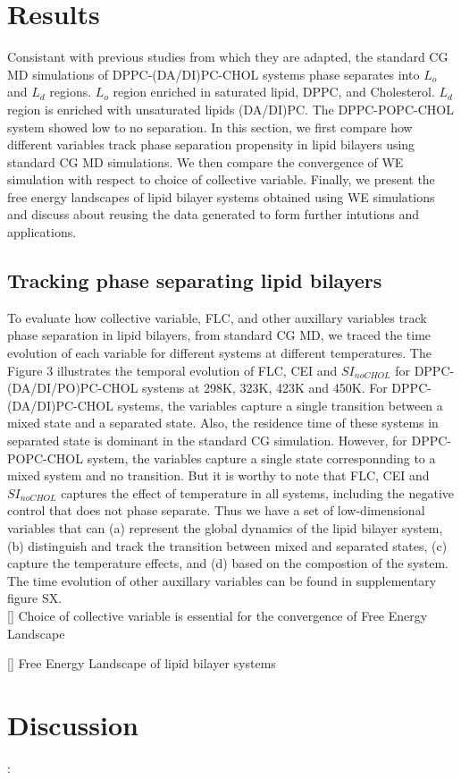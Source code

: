 \documentclass{biophys-new}
\begin{document}
\section*{Results}

Consistant with previous studies from which they are adapted, the standard CG MD simulations of DPPC-(DA/DI)PC-CHOL systems phase separates into $L_o$ and $L_d$ regions.
$L_o$ region enriched in saturated lipid, DPPC, and Cholesterol. 
$L_d$ region is enriched with unsaturated lipids (DA/DI)PC.
The DPPC-POPC-CHOL system showed low to no separation.
In this section, we first compare how different variables track phase separation propensity in lipid bilayers using standard CG MD simulations.
We then compare the convergence of WE simulation with respect to choice of collective variable.
Finally, we present the free energy landscapes of lipid bilayer systems obtained using WE simulations and discuss about reusing the data generated to form further intutions and applications.

\subsection*{Tracking phase separating lipid bilayers}

To evaluate how collective variable, FLC, and other auxillary variables track phase separation in lipid bilayers,
from standard CG MD, we traced the time evolution of each variable for different systems at different temperatures.
The Figure 3 illustrates the temporal evolution of FLC, CEI and $SI_{noCHOL}$ for DPPC-(DA/DI/PO)PC-CHOL systems at 298K, 323K, 423K and 450K.
For DPPC-(DA/DI)PC-CHOL systems, the variables capture a single transition between a mixed state and a separated state.
Also, the residence time of these systems in separated state is dominant in the standard CG simulation.
However, for DPPC-POPC-CHOL system, the variables capture a single state corresponnding to a mixed system and no transition.
But it is worthy to note that FLC, CEI and $SI_{noCHOL}$ captures the effect of temperature in all systems, including the negative control that does not phase separate.
Thus we have a set of low-dimensional variables that can (a) represent the global dynamics of the lipid bilayer system,
(b) distinguish and track the transition between mixed and separated states, (c) capture the temperature effects,
and (d) based on the compostion of the system.
The time evolution of other auxillary variables can be found in supplementary figure SX.
\\


[] Choice of collective variable is essential for the convergence of Free Energy Landscape

[] Free Energy Landscape of lipid bilayer systems


\section*{Discussion}:





\end{document}
